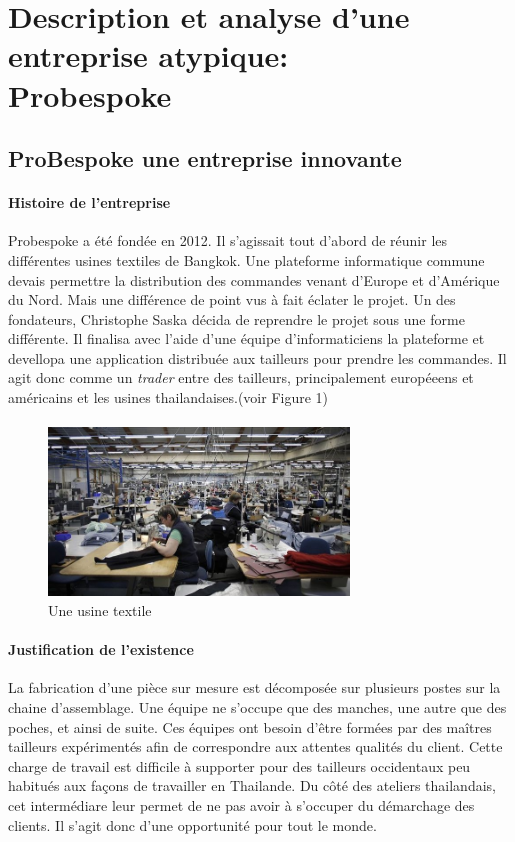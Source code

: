 \section{Description et analyse d'une entreprise atypique: \\Probespoke}
\subsection{ProBespoke une entreprise innovante}

\paragraph{Histoire de l'entreprise}
Probespoke a été fondée en 2012. Il s'agissait tout d'abord de réunir les différentes usines textiles de Bangkok.
Une plateforme informatique commune devais permettre la distribution des commandes venant d'Europe et d'Amérique du Nord.
Mais une différence de point vus à fait éclater le projet. Un des fondateurs, Christophe Saska décida de reprendre le projet sous une forme différente. Il finalisa avec l'aide d'une équipe d'informaticiens la plateforme et devellopa une application distribuée aux tailleurs pour prendre les commandes. Il agit donc comme un \textit{trader} entre des tailleurs, principalement européeens et américains et les usines thailandaises.(voir Figure 1)
\paragraph{}

\paragraph{}
\clearpage
\begin{figure}
\includegraphics[width=8cm]{image/textile.jpg}
\caption{Une usine textile}
\end{figure}
\paragraph{Justification de l'existence}
 La fabrication d'une pièce sur mesure est décomposée sur plusieurs postes sur la chaine d'assemblage. Une équipe ne s'occupe que des manches, une autre que des poches, et ainsi de suite. Ces équipes ont besoin d'être formées par des maîtres tailleurs expérimentés afin de correspondre aux attentes qualités du client. Cette charge de travail est difficile à supporter pour des tailleurs occidentaux peu habitués aux façons de travailler en Thailande. Du côté des ateliers thailandais, cet intermédiare leur permet de ne pas avoir à s'occuper du démarchage des clients. Il s'agit donc d'une opportunité pour tout le monde.

